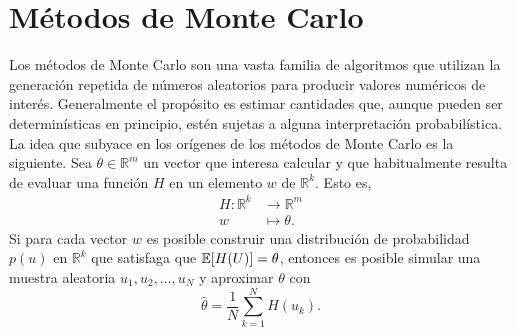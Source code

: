 




\section{Métodos de Monte Carlo}


Los métodos de Monte Carlo son una vasta familia de algoritmos que utilizan la generación repetida de números aleatorios para producir valores numéricos de interés. Generalmente el propósito es estimar cantidades que, aunque pueden ser determinísticas en principio, estén sujetas a alguna interpretación probabilística. 
La idea que subyace en los orígenes de los métodos de Monte Carlo es la siguiente. Sea $\theta \in \mathbb{R}^m$ un vector que interesa calcular y que habitualmente resulta de evaluar una función $H$ en un elemento $w$ de $\mathbb{R}^k$. Esto es,
\begin{align*}
	H: \mathbb{R}^k &\to \mathbb{R}^m \\
                  w &\mapsto \theta.
\end{align*}
Si para cada vector $w$ es posible construir una distribución de probabilidad $p(u)$ en $\mathbb{R}^k$ que satisfaga que $\mathbb{E} [H(U)] = \theta$, entonces es posible simular una muestra aleatoria $u_1, u_2, ..., u_N$ y aproximar $\theta$ con
\begin{equation*}
	\hat{\theta} = \frac{1}{N} \sum_{k=1}^{N} H(u_k).
\end{equation*}
 
